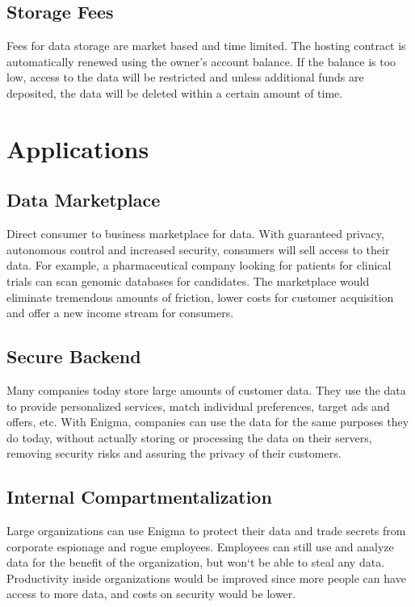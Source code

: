 \documentclass{article} \usepackage{nips13submit_e,times}
\begin{document}
\subsection{Storage Fees}

Fees for data storage are market based and time limited. The hosting contract is automatically renewed using the owner's account balance. If the balance is too low, access to the data will be restricted and unless additional funds are deposited, the data will be deleted within a certain amount of time.


\section{Applications}


\subsection{Data Marketplace}

Direct consumer to business marketplace for data. With guaranteed privacy, autonomous control and increased security, consumers will sell access to their data. For example, a pharmaceutical company looking for patients for clinical trials can scan genomic databases for candidates. The marketplace would eliminate tremendous amounts of friction, lower costs for customer acquisition and offer a new income stream for consumers.

\subsection{Secure Backend}

Many companies today store large amounts of customer data. They use the data to provide personalized services, match individual preferences, target ads and offers, etc. With Enigma, companies can use the data for the same purposes they do today, without actually storing or processing the data on their servers, removing security risks and assuring the privacy of their customers. 

\subsection{Internal Compartmentalization}

Large organizations can use Enigma to protect their data and trade secrets from corporate espionage and rogue employees. Employees can still use and analyze data for the benefit of the organization, but won`t be able to steal any data. Productivity inside organizations would be improved since more people can have access to more data, and costs on security would be lower.
\end{document}
